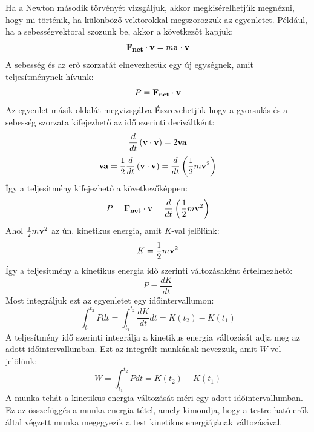 \documentclass[../main.tex]{subfiles}
\begin{document}
Ha a Newton második törvényét vizsgáljuk, akkor megkisérelhetjük megnézni, hogy mi történik, ha különböző vektorokkal megszorozzuk az egyenletet. Például, ha a sebességvektoral szozunk be,
akkor a következőt kapjuk:
\begin{equation}
    \bold{F_{net}} \cdot \bold{v} = m\bold{a} \cdot \bold{v}
\end{equation}
A sebesség és az erő szorzatát elnevezhetük egy új egységnek, amit teljesítménynek hívunk:
\begin{equation}
    P = \bold{F_{net}} \cdot \bold{v}
\end{equation}
Az egyenlet másik oldalát megvizsgálva Észrevehetjük hogy a gyorsulás és a sebesség szorzata kifejezhető az idő szerinti deriváltként:
\begin{equation}
    \frac{d}{dt}\left(\bold{v} \cdot \bold{v}\right) = 2 \bold{v}\bold{a}
\end{equation}
\begin{equation}
    \bold{v}\bold{a} = \frac{1}{2} \frac{d}{dt}\left(\bold{v} \cdot \bold{v}\right) = \frac{d}{dt}\left(\frac{1}{2} m \bold{v}^2\right)
\end{equation}
Így a teljesítmény kifejezhető a következőképpen:
\begin{equation}
    P = \bold{F_{net}} \cdot \bold{v} = \frac{d}{dt}\left(\frac{1}{2} m \bold{v}^2\right)
\end{equation}
Ahol $\frac{1}{2} m \bold{v}^2$ az ún. kinetikus energia, amit $K$-val jelölünk:
\begin{equation}
    K = \frac{1}{2} m \bold{v}^2
\end{equation}
Így a teljesítmény a kinetikus energia idő szerinti változásaként értelmezhető:
\begin{equation}
    P = \frac{dK}{dt}
\end{equation}
Most integráljuk ezt az egyenletet egy időintervallumon:
\begin{equation}
    \int_{t_1}^{t_2} P dt = \int_{t_1}^{t_2} \frac{dK}{dt} dt = K(t_2) - K(t_1)
\end{equation}
A teljesítmény idő szerinti integrálja a kinetikus energia változását adja meg az adott időintervallumban. Ezt az integrált munkának nevezzük, amit $W$-vel jelölünk:
\begin{equation}
    W = \int_{t_1}^{t_2} P dt = K(t_2) - K(t_1)
\end{equation}
A munka tehát a kinetikus energia változását méri egy adott időintervallumban. Ez az összefüggés a munka-energia tétel, amely kimondja, hogy a testre ható erők által végzett munka megegyezik a test kinetikus energiájának változásával.
\end{document}

